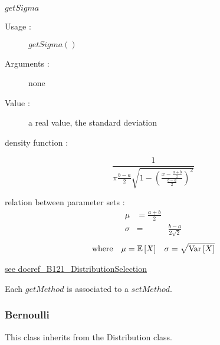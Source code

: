 \begin{description}
\begin{description}
  \item $getSigma$
    \begin{description}
    \item[Usage :] $getSigma()$
    \item[Arguments :] none
    \item[Value :]  a real value, the standard deviation
    \end{description}



  \end{description}

\item[Details :]  \rule{0pt}{1em}
  \begin{description}
  \item density function :

    $$\frac{1}{\pi\frac{b-a}{2}\sqrt{1-\left(\frac{x-\frac{a+b}{2}}{\frac{b-a}{2}}\right)^{2}}}$$

  \item relation between parameter sets :
    \begin{eqnarray*}
      \mu                                       &       =       \frac{a+b}{2}   \\
      \sigma                            &  =    &       \frac{b-a}{2\sqrt{2}}
    \end{eqnarray*}
    \begin{align*}
      \mbox{where}
      &&
      \mu = {\mathbb E}\left[ X \right]
      &&
      \sigma = \sqrt{{\rm Var}\left[ X \right] }
    \end{align*}
  \end{description}
  \bigskip

\item[Links :]  \rule{0pt}{1em}
  \href{./Version/docref_B121_DistributionSelection.pdf}{see docref\_B121\_DistributionSelection}
\end{description}


Each  $getMethod$  is associated to a $setMethod$.

\newpage \subsubsection{Bernoulli}

This class inherits from the Distribution class.

